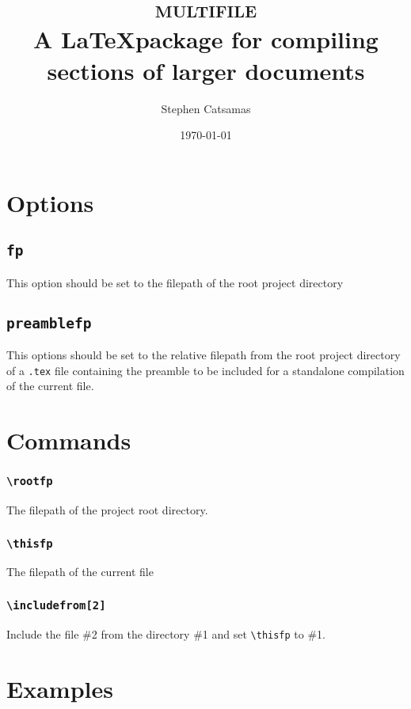 \documentclass{article}
\title{\Huge\textsc{multifile} \\\vspace*{1 em}
    \large A \LaTeX package for compiling sections of larger documents}
\author{Stephen Catsamas}
\date{\today}
\begin{document}
\maketitle
\tableofcontents


\section{Options}
\subsection{\texttt{fp}}\label{sec:opt:fp}
    This option should be set to the filepath of the root project directory

\subsection{\texttt{preamblefp}}\label{sec:opt:preamblefp}
    This options should be set to the relative filepath from the root project directory of a \texttt{.tex} file containing the preamble to be included for a standalone compilation of the current file. 

\section{Commands}

\subsubsection{\texttt{\textbackslash rootfp}}
    The filepath of the project root directory.

\subsubsection{\texttt{\textbackslash thisfp}}
    The filepath of the current file

\subsubsection{\texttt{\textbackslash includefrom[2]}}
    Include the file \#2 from the directory \#1 and set \texttt{\textbackslash thisfp} to \#1.


\section{Examples}
\end{document}
